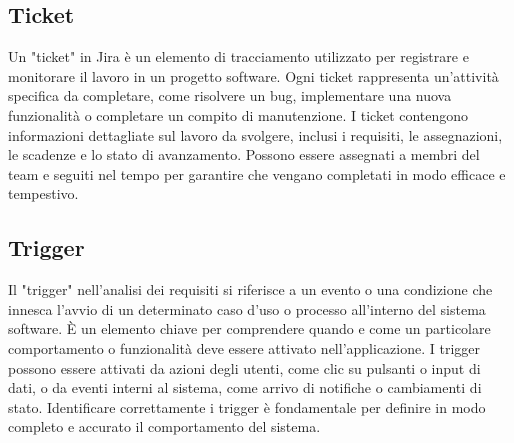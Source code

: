 \subsection{Ticket} 
Un "ticket" in Jira è un elemento di tracciamento utilizzato per registrare e monitorare il lavoro in un progetto software. Ogni ticket rappresenta un'attività specifica da completare, come risolvere un bug, implementare una nuova funzionalità o completare un compito di manutenzione. I ticket contengono informazioni dettagliate sul lavoro da svolgere, inclusi i requisiti, le assegnazioni, le scadenze e lo stato di avanzamento. Possono essere assegnati a membri del team e seguiti nel tempo per garantire che vengano completati in modo efficace e tempestivo. 
\subsection{Trigger} 
Il "trigger" nell'analisi dei requisiti si riferisce a un evento o una condizione che innesca l'avvio di un determinato caso d'uso o processo all'interno del sistema software. È un elemento chiave per comprendere quando e come un particolare comportamento o funzionalità deve essere attivato nell'applicazione. I trigger possono essere attivati da azioni degli utenti, come clic su pulsanti o input di dati, o da eventi interni al sistema, come arrivo di notifiche o cambiamenti di stato. Identificare correttamente i trigger è fondamentale per definire in modo completo e accurato il comportamento del sistema. 
